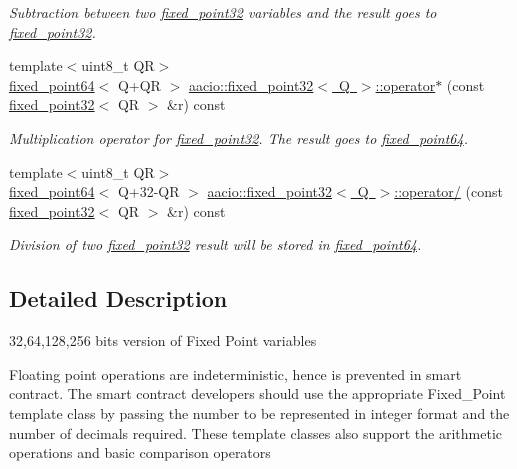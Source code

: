 \begin{DoxyCompactItemize}
\begin{DoxyCompactList}\small\item\em Subtraction between two \mbox{\hyperlink{structaacio_1_1fixed__point32}{fixed\+\_\+point32}} variables and the result goes to \mbox{\hyperlink{structaacio_1_1fixed__point32}{fixed\+\_\+point32}}. \end{DoxyCompactList}\item 
{\footnotesize template$<$uint8\+\_\+t QR$>$ }\\\mbox{\hyperlink{structaacio_1_1fixed__point64}{fixed\+\_\+point64}}$<$ Q+QR $>$ \mbox{\hyperlink{group__fixedpoint_gae967c9f563576da13c0ba7617aaea623}{aacio\+::fixed\+\_\+point32$<$ Q $>$\+::operator$\ast$}} (const \mbox{\hyperlink{structaacio_1_1fixed__point32}{fixed\+\_\+point32}}$<$ QR $>$ \&r) const
\begin{DoxyCompactList}\small\item\em Multiplication operator for \mbox{\hyperlink{structaacio_1_1fixed__point32}{fixed\+\_\+point32}}. The result goes to \mbox{\hyperlink{structaacio_1_1fixed__point64}{fixed\+\_\+point64}}. \end{DoxyCompactList}\item 
{\footnotesize template$<$uint8\+\_\+t QR$>$ }\\\mbox{\hyperlink{structaacio_1_1fixed__point64}{fixed\+\_\+point64}}$<$ Q+32-\/QR $>$ \mbox{\hyperlink{group__fixedpoint_ga47eb3555482ded843d054f02bae32c3e}{aacio\+::fixed\+\_\+point32$<$ Q $>$\+::operator/}} (const \mbox{\hyperlink{structaacio_1_1fixed__point32}{fixed\+\_\+point32}}$<$ QR $>$ \&r) const
\begin{DoxyCompactList}\small\item\em Division of two \mbox{\hyperlink{structaacio_1_1fixed__point32}{fixed\+\_\+point32}} result will be stored in \mbox{\hyperlink{structaacio_1_1fixed__point64}{fixed\+\_\+point64}}. \end{DoxyCompactList}\end{DoxyCompactItemize}


\subsection{Detailed Description}
32,64,128,256 bits version of Fixed Point variables 

Floating point operations are indeterministic, hence is prevented in smart contract. The smart contract developers should use the appropriate Fixed\+\_\+\+Point template class by passing the number to be represented in integer format and the number of decimals required. These template classes also support the arithmetic operations and basic comparison operators 


